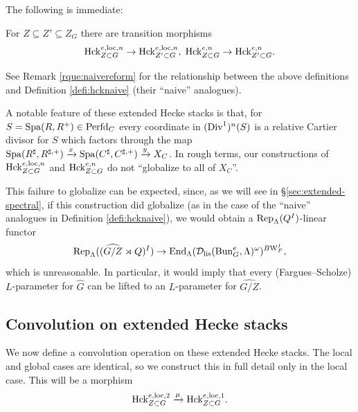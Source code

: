 The following is immediate:
\begin{lem}
For $Z \subseteq Z' \subseteq Z_{G}$ there are transition morphisms
\begin{equation}\label{eq:Ztrans}
\textnormal{Hck}_{Z \subset G}^{e,\mathrm{loc},n} \to \textnormal{Hck}_{Z' \subset G}^{e,\mathrm{loc},n}, \hspace{1mm} \textnormal{Hck}_{Z \subset G}^{e,n} \to \textnormal{Hck}_{Z' \subset G}^{e,n}.
\end{equation}
\end{lem}

See Remark \ref{rque:naivereform} for the relationship between the above definitions and Definition \ref{defi:hcknaive} (their ``naive'' analogues).

\begin{rque}\label{rque:non-gluing-to-div-1}
    A notable feature of these extended Hecke stacks is that, for $S = \mathrm{Spa}(R,R^{+}) \in \mathrm{Perfd}_{C}$ every coordinate in $(\mathrm{Div}^{1})^{n}(S)$ is a relative Cartier divisor for $S$ which factors through the map $\mathrm{Spa}(R^{\sharp},R^{\sharp,+}) \xrightarrow{x} \mathrm{Spa}(C^{\sharp},C^{\sharp,+}) \xrightarrow{y} X_{C}$. %
    In rough terms, our constructions of $\textnormal{Hck}_{Z \subset G}^{e,\mathrm{loc},n}$ and $\textnormal{Hck}_{Z \subset G}^{e,n}$ do not ``globalize to all of $X_{C}$''. 
    
    This failure to globalize can be expected, since, as we will see in \S \ref{sec:extended-spectral}, if this construction did globalize (as in the case of the ``naive'' analogues in Definition \ref{defi:hcknaive}), we would obtain a $\textnormal{Rep}_{\Lambda}(Q^{I})$-linear functor
    \begin{equation*}
        \textnormal{Rep}_{\Lambda}((\widehat{G/Z} \rtimes Q)^{I}) \to \mathrm{End}_{\Lambda}(\mathcal{D}_{\textnormal{lis}}(\mathrm{Bun}_{G}^{e},\Lambda)^{\omega})^{B\mathrm{W}_{F}^{I}},
    \end{equation*}
which is unreasonable. In particular, it would imply that every (Fargues--Scholze) $L$-parameter for $\widehat{G}$ can be lifted to an $L$-parameter for $\widehat{G/Z}$.
\end{rque}

\subsection{Convolution on extended Hecke stacks}\label{sec:Hckconv}
We now define a convolution operation on these extended Hecke stacks. The local and global cases are identical, so we construct this in full detail only in the local case. This will be a morphism
\begin{equation*}
    \textnormal{Hck}_{Z \subset G}^{e,\mathrm{loc},2} \xrightarrow{\mu} \textnormal{Hck}_{Z \subset G}^{e,\mathrm{loc},1}.
\end{equation*}

